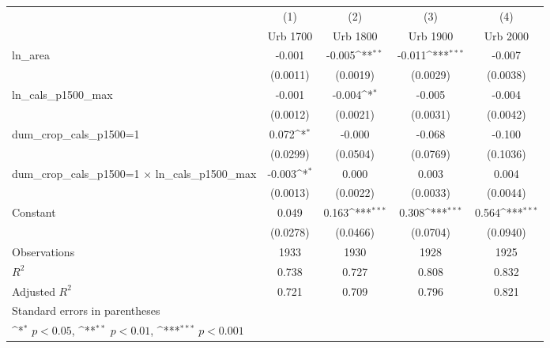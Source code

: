 {
\def\sym#1{\ifmmode^{#1}\else\(^{#1}\)\fi}
\begin{tabular}{l*{4}{c}}
\toprule
                    &\multicolumn{1}{c}{(1)}&\multicolumn{1}{c}{(2)}&\multicolumn{1}{c}{(3)}&\multicolumn{1}{c}{(4)}\\
                    &\multicolumn{1}{c}{Urb 1700}&\multicolumn{1}{c}{Urb 1800}&\multicolumn{1}{c}{Urb 1900}&\multicolumn{1}{c}{Urb 2000}\\
\midrule
ln\_area             &      -0.001         &      -0.005\sym{**} &      -0.011\sym{***}&      -0.007         \\
                    &    (0.0011)         &    (0.0019)         &    (0.0029)         &    (0.0038)         \\
\addlinespace
ln\_cals\_p1500\_max   &      -0.001         &      -0.004\sym{*}  &      -0.005         &      -0.004         \\
                    &    (0.0012)         &    (0.0021)         &    (0.0031)         &    (0.0042)         \\
\addlinespace
dum\_crop\_cals\_p1500=1&       0.072\sym{*}  &      -0.000         &      -0.068         &      -0.100         \\
                    &    (0.0299)         &    (0.0504)         &    (0.0769)         &    (0.1036)         \\
\addlinespace
dum\_crop\_cals\_p1500=1 $\times$ ln\_cals\_p1500\_max&      -0.003\sym{*}  &       0.000         &       0.003         &       0.004         \\
                    &    (0.0013)         &    (0.0022)         &    (0.0033)         &    (0.0044)         \\
\addlinespace
Constant            &       0.049         &       0.163\sym{***}&       0.308\sym{***}&       0.564\sym{***}\\
                    &    (0.0278)         &    (0.0466)         &    (0.0704)         &    (0.0940)         \\
\midrule
Observations        &        1933         &        1930         &        1928         &        1925         \\
\(R^{2}\)           &       0.738         &       0.727         &       0.808         &       0.832         \\
Adjusted \(R^{2}\)  &       0.721         &       0.709         &       0.796         &       0.821         \\
\bottomrule
\multicolumn{5}{l}{\footnotesize Standard errors in parentheses}\\
\multicolumn{5}{l}{\footnotesize \sym{*} \(p<0.05\), \sym{**} \(p<0.01\), \sym{***} \(p<0.001\)}\\
\end{tabular}
}

